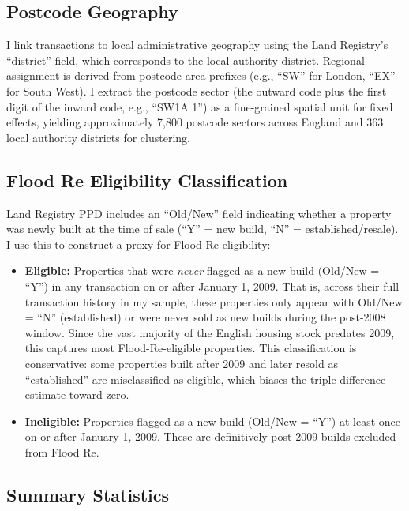 \documentclass[12pt]{article}
\begin{document}
\subsection{Postcode Geography}

I link transactions to local administrative geography using the Land Registry's ``district'' field, which corresponds to the local authority district. Regional assignment is derived from postcode area prefixes (e.g., ``SW'' for London, ``EX'' for South West). I extract the postcode sector (the outward code plus the first digit of the inward code, e.g., ``SW1A 1'') as a fine-grained spatial unit for fixed effects, yielding approximately 7,800 postcode sectors across England and 363 local authority districts for clustering.

\subsection{Flood Re Eligibility Classification}

Land Registry PPD includes an ``Old/New'' field indicating whether a property was newly built at the time of sale (``Y'' = new build, ``N'' = established/resale). I use this to construct a proxy for Flood Re eligibility:

\begin{itemize}
\item \textbf{Eligible:} Properties that were \textit{never} flagged as a new build (Old/New = ``Y'') in any transaction on or after January 1, 2009. That is, across their full transaction history in my sample, these properties only appear with Old/New = ``N'' (established) or were never sold as new builds during the post-2008 window. Since the vast majority of the English housing stock predates 2009, this captures most Flood-Re-eligible properties. This classification is conservative: some properties built after 2009 and later resold as ``established'' are misclassified as eligible, which biases the triple-difference estimate toward zero.
\item \textbf{Ineligible:} Properties flagged as a new build (Old/New = ``Y'') at least once on or after January 1, 2009. These are definitively post-2009 builds excluded from Flood Re.
\end{itemize}

\subsection{Summary Statistics}
\end{document}
